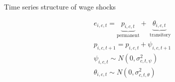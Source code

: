 \documentclass{beamer}
\begin{document}
\begin{frame}{Time series structure of wage shocks}

\begin{equation*}
	\begin{split}
& e_{i,c,t} = \underbrace{p_{i,c,t}}_{\text{permanent}} + \underbrace{\theta_{i,c,t}}_{\text{ transitory}} \\
& p_{i,c,t+1} = p_{i,c,t} + \psi_{i,c,t+1} \\
& \psi_{i,c,t} \sim N(0,\sigma^2_{c,t,\psi}) \\
 & \theta_{i,c,t} \sim N(0,\sigma^2_{c,t,\theta}) \\
\end{split} 
	\end{equation*}
\end{frame}
\end{document}
